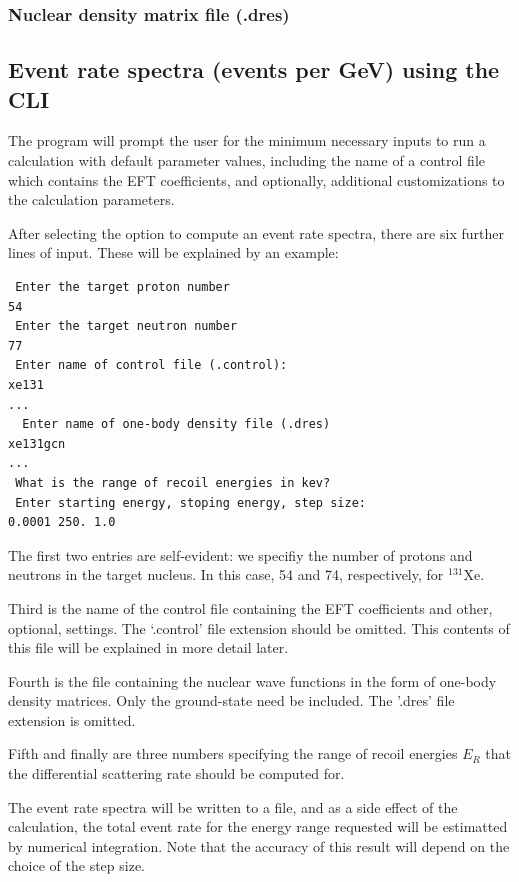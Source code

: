 \documentclass[
14pt, %
a4paper, %
oneside, %
headinclude,footinclude, %
BCOR5mm, %
]{scrartcl}
\begin{document}
\subsubsection{Nuclear density matrix file (.dres)}

\subsection{Event rate spectra (events per GeV) using the CLI}
The program will prompt the user for the minimum necessary inputs to run a
calculation with default parameter values, including the name of a control file
which contains the EFT coefficients, and optionally, additional customizations
to the calculation parameters.

After selecting the option to compute an event rate spectra, there are six
further lines of input. These will be explained by an example:

\begin{verbatim}
 Enter the target proton number
54
 Enter the target neutron number 
77 
 Enter name of control file (.control):
xe131
...
  Enter name of one-body density file (.dres)
xe131gcn
...
 What is the range of recoil energies in kev?
 Enter starting energy, stoping energy, step size:
0.0001 250. 1.0
\end{verbatim}

The first two entries are self-evident: we specifiy the number of protons and
neutrons in the target nucleus. In this case, 54 and 74, respectively, for
$^{131}$Xe.

Third is the name of the control file containing the EFT coefficients and other,
optional, settings. The `.control' file extension should be omitted. This 
contents of this file will be explained in more detail later.

Fourth is the file containing the nuclear wave functions in the form of one-body
density matrices. Only the ground-state need be included. The '.dres' file
extension is omitted. 

Fifth and finally are three numbers specifying the range of recoil energies
$E_R$ that the differential scattering rate should be computed for.

The event rate spectra will be written to a file, and as a side effect of the
calculation, the total event rate for the energy range requested will be
estimatted by numerical integration. Note that the accuracy of this result will
depend on the choice of the step size.
\end{document}
